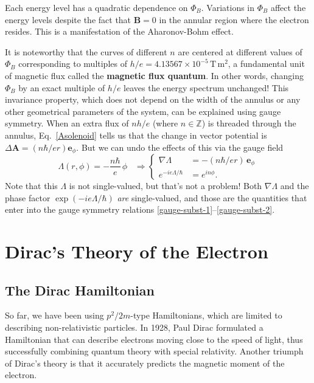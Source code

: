 \documentclass[prx,12pt]{revtex4-2}
\begin{document}
Each energy level has a quadratic dependence on $\Phi_B$.  Variations
in $\Phi_B$ affect the energy levels despite the fact that $\mathbf{B}
= 0$ in the annular region where the electron resides.  This is a
manifestation of the Aharonov-Bohm effect.

It is noteworthy that the curves of different $n$ are centered at
different values of $\Phi_B$ corresponding to multiples of $h/e =
4.13567\times10^{-5}\,\mathrm{T}\,\mathrm{m}^2$, a fundamental unit of
magnetic flux called the \textbf{magnetic flux quantum}.  In other
words, changing $\Phi_B$ by an exact multiple of $h/e$ leaves the
energy spectrum unchanged!  This invariance property, which does not
depend on the width of the annulus or any other geometrical parameters
of the system, can be explained using gauge symmetry.  When an extra
flux of $nh/e$ (where $n\in\mathbb{Z}$) is threaded through the
annulus, Eq.~\eqref{Asolenoid} tells us that the change in vector
potential is $\Delta \mathbf{A} = (n\hbar/ e r) \mathbf{e}_\phi$.  But
we can undo the effects of this via the gauge field
\begin{equation}
  \Lambda(r,\phi) = - \frac{n\hbar}{e} \, \phi \;\;\;\Rightarrow
  \begin{cases}\nabla \Lambda &= \displaystyle - (n\hbar/er) \, \mathbf{e}_\phi
    \\ \displaystyle e^{-ie\Lambda/\hbar} &= \displaystyle e^{in\phi}.
  \end{cases}
\end{equation}
Note that this $\Lambda$ is not single-valued, but that's not a
problem!  Both $\nabla\Lambda$ and the phase factor
$\exp(-ie\Lambda/\hbar)$ \textit{are} single-valued, and those are the
quantities that enter into the gauge symmetry relations
\eqref{gauge-subst-1}--\eqref{gauge-subst-2}.

\section{Dirac's Theory of the Electron}

\subsection{The Dirac Hamiltonian}
\label{sec:DiracH}

So far, we have been using $p^2/2m$-type Hamiltonians, which are
limited to describing non-relativistic particles.  In 1928, Paul Dirac
formulated a Hamiltonian that can describe electrons moving close to
the speed of light, thus successfully combining quantum theory with
special relativity. Another triumph of Dirac's theory is that it
accurately predicts the magnetic moment of the electron.
\end{document}
